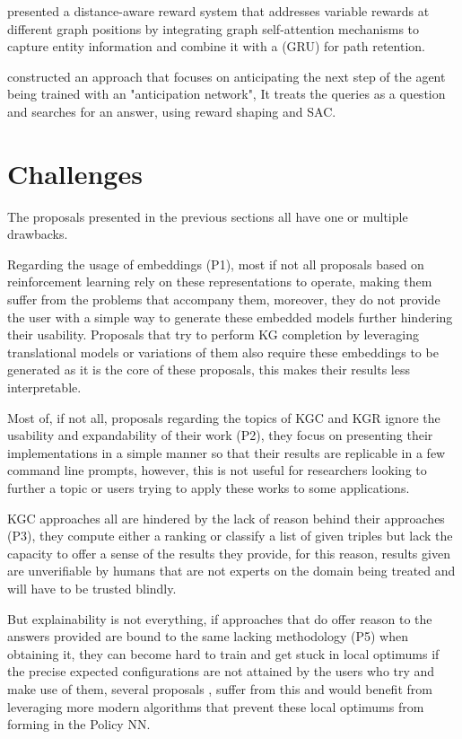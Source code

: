 \citet{tiwari2021dapath} presented a distance-aware reward system that addresses variable rewards at different graph positions by integrating graph self-attention mechanisms to capture entity information and combine it with a (GRU) for path retention.

\citet{cui2023incorporating} constructed an approach that focuses on anticipating the next step of the agent being trained with an "anticipation network", It treats the queries as a question and searches for an answer, using reward shaping and SAC.

\section{Challenges}\label{sec:moti-discussion}

The proposals presented in the previous sections all have one or multiple drawbacks.

Regarding the usage of embeddings (P1), most if not all proposals based on reinforcement learning rely on these representations to operate, making them suffer from the problems that accompany them, moreover, they do not provide the user with a simple way to generate these embedded models further hindering their usability. Proposals that try to perform KG completion by leveraging translational models or variations of them also require these embeddings to be generated as it is the core of these proposals, this makes their results less interpretable.

Most of, if not all, proposals regarding the topics of KGC and KGR ignore the usability and expandability of their work (P2), they focus on presenting their implementations in a simple manner so that their results are replicable in a few command line prompts, however, this is not useful for researchers looking to further a topic or users trying to apply these works to some applications.

KGC approaches \cite{nickel2011three, bordes2013translating, wang2014knowledge,vashishth2020interacte} all are hindered by the lack of reason behind their approaches (P3), they compute either a ranking or classify a list of given triples but lack the capacity to offer a sense of the results they provide, for this reason, results given are unverifiable by humans that are not experts on the domain being treated and will have to be trusted blindly.

But explainability is not everything, if approaches that do offer reason to the answers provided are bound to the same lacking methodology (P5) when obtaining it, they can become hard to train and get stuck in local optimums if the precise expected configurations are not attained by the users who try and make use of them, several proposals \cite{das2017go, lin2018multi, tiwari2021dapath, vashishth2020interacte, xiong2017deeppath, xian2019reinforcement}, suffer from this and would benefit from leveraging more modern algorithms that prevent these local optimums from forming in the Policy NN.

